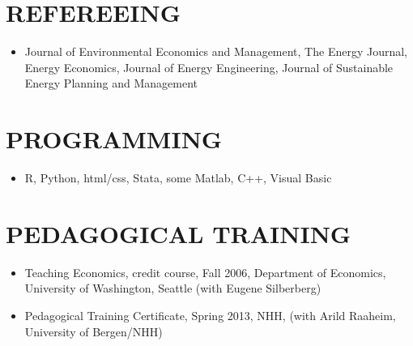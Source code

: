 \documentclass[margin]{res}
\begin{document}
\begin{resume}
\section{REFEREEING}  
\begin{itemize}
\item[] Journal of Environmental Economics and Management, The Energy Journal, Energy Economics, Journal of Energy Engineering, Journal of Sustainable Energy Planning and Management
 \end{itemize}

\section{PROGRAMMING}
\begin{itemize}
  \item[] R, Python, html/css, Stata, some Matlab, C++, Visual Basic
\end{itemize}

\section{PEDAGOGICAL TRAINING}
\begin{itemize}
\setlength{\itemsep}{10pt}
\item[] Teaching Economics, credit course, Fall 2006, Department of Economics, University of Washington, Seattle (with Eugene Silberberg)

\item[] Pedagogical Training Certificate, Spring 2013, NHH, (with Arild Raaheim, University of Bergen/NHH)
\end{itemize}



\end{resume} 
\end{document}
